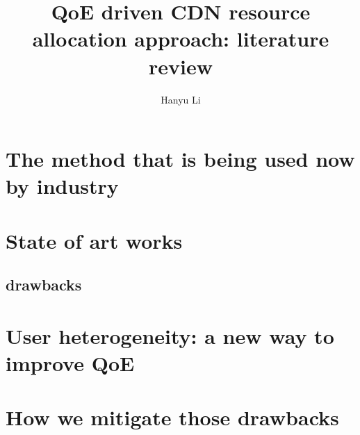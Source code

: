 \documentclass{ctexart}
\title{QoE driven CDN resource allocation approach: literature review}
\author{Hanyu Li}
\begin{document}
\maketitle
\section{The method that is being used now by industry}
\section{State of art works}
\subsection{drawbacks}
\section{User heterogeneity: a new way to improve QoE}
\section{How we mitigate those drawbacks}


\nocite{*}


\end{document}
